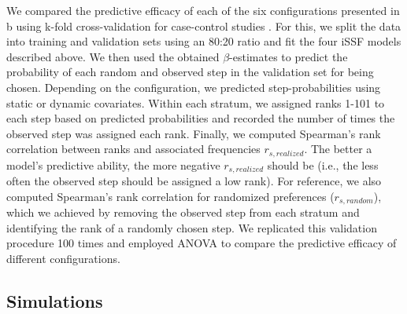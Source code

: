 \documentclass[../FinalThesis.tex]{subfiles}
\begin{document}
We compared the predictive efficacy of each of the six configurations presented
in b using k-fold cross-validation for case-control
studies \citep{Fortin.2009}. For this, we split the data into training and
validation sets using an 80:20 ratio and fit the four iSSF models described
above. We then used the obtained $\beta$-estimates to predict the probability of
each random and observed step in the validation set for being chosen. Depending
on the configuration, we predicted step-probabilities using static or dynamic
covariates. Within each stratum, we assigned ranks 1-101 to each step based on
predicted probabilities and recorded the number of times the observed step was
assigned each rank. Finally, we computed Spearman's rank correlation between
ranks and associated frequencies $r_{s, realized}$. The better a model's
predictive ability, the more negative $r_{s, realized}$ should be (i.e., the
less often the observed step should be assigned a low rank). For reference, we
also computed Spearman's rank correlation for randomized preferences ($r_{s,
random}$), which we achieved by removing the observed step from each stratum and
identifying the rank of a randomly chosen step. We replicated this validation
procedure 100 times and employed ANOVA to compare the predictive efficacy of
different configurations.

\subsection{Simulations}
\end{document}
